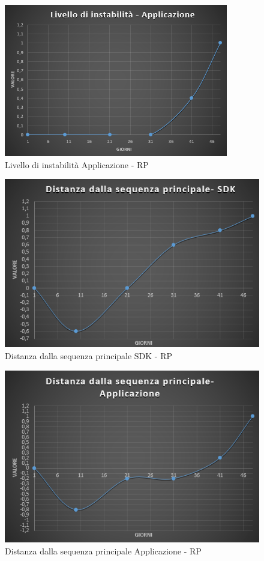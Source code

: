\begin{figure}[H]
	\centering 
	\includegraphics[scale=0.85]{Sezioni/Immagini/LivelloInstabilitaApp-RP}
	\caption{Livello di instabilità Applicazione - RP}
\end{figure}

\begin{figure}[H]
	\centering 
	\includegraphics[scale=0.63]{Sezioni/Immagini/DistanzaSDK-RP}
	\caption{Distanza dalla sequenza principale SDK - RP}
\end{figure}

\begin{figure}[H]
	\centering 
	\includegraphics[scale=0.63]{Sezioni/Immagini/DistanzaApp-RP}
	\caption{Distanza dalla sequenza principale Applicazione - RP}
\end{figure}

